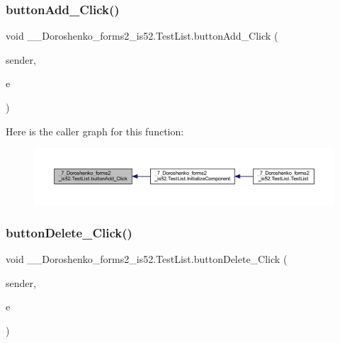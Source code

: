 \subsubsection{\texorpdfstring{button\+Add\+\_\+\+Click()}{buttonAdd\_Click()}}
{\footnotesize\ttfamily void \+\_\+\_\+\+Doroshenko\+\_\+forms2\+\_\+is52.\+Test\+List.\+button\+Add\+\_\+\+Click (\begin{DoxyParamCaption}\item[{object}]{sender,  }\item[{Event\+Args}]{e }\end{DoxyParamCaption})\hspace{0.3cm}{\ttfamily [private]}}

Here is the caller graph for this function\+:
\nopagebreak
\begin{figure}[H]
\begin{center}
\leavevmode
\includegraphics[width=350pt]{class__7___doroshenko__forms2__is52_1_1_test_list_a87ffd4c72f84d90e75d20bd62f0ee4f7_icgraph}
\end{center}
\end{figure}
\hypertarget{class__7___doroshenko__forms2__is52_1_1_test_list_a161230ed32af2e62e141a8c6e8a4bedd}{}\label{class__7___doroshenko__forms2__is52_1_1_test_list_a161230ed32af2e62e141a8c6e8a4bedd} 
\subsubsection{\texorpdfstring{button\+Delete\+\_\+\+Click()}{buttonDelete\_Click()}}
{\footnotesize\ttfamily void \+\_\+\_\+\+Doroshenko\+\_\+forms2\+\_\+is52.\+Test\+List.\+button\+Delete\+\_\+\+Click (\begin{DoxyParamCaption}\item[{object}]{sender,  }\item[{Event\+Args}]{e }\end{DoxyParamCaption})\hspace{0.3cm}{\ttfamily [private]}}

